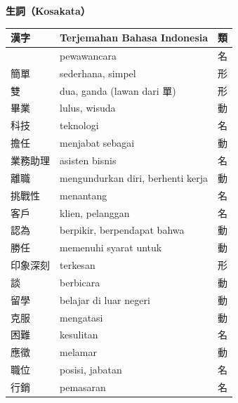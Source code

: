 \documentclass[a4paper,12pt]{ctexart}
\newcommand{\vocabnohi}[1]{{\fontsize{14pt}{16pt}\selectfont\hanwangfont #1}}
\begin{document}
\vspace{1cm}
\begin{center}
{\Large\bfseries 生詞（Kosakata）}
\end{center}

\begin{longtable}{|>{\centering\arraybackslash}p{3.5cm}|p{8.5cm}|>{\centering\arraybackslash}p{1.5cm}|}
\hline
\rowcolor[gray]{0.9}
\textbf{漢字} & \textbf{Terjemahan Bahasa Indonesia} & \textbf{類} \\
\hline
\vocabnohi{面試官} & pewawancara & {\footnotesize 名} \\
\hline
\vocabnohi{簡單} & sederhana, simpel & {\footnotesize 形} \\
\hline
\vocabnohi{雙} & dua, ganda (lawan dari 單) & {\footnotesize 形} \\
\hline
\vocabnohi{畢業} & lulus, wisuda & {\footnotesize 動} \\
\hline
\vocabnohi{科技} & teknologi & {\footnotesize 名} \\
\hline
\vocabnohi{擔任} & menjabat sebagai & {\footnotesize 動} \\
\hline
\vocabnohi{業務助理} & asisten bisnis & {\footnotesize 名} \\
\hline
\vocabnohi{離職} & mengundurkan diri, berhenti kerja & {\footnotesize 動} \\
\hline
\vocabnohi{挑戰性} & menantang & {\footnotesize 名} \\
\hline
\vocabnohi{客戶} & klien, pelanggan & {\footnotesize 名} \\
\hline
\vocabnohi{認為} & berpikir, berpendapat bahwa & {\footnotesize 動} \\
\hline
\vocabnohi{勝任} & memenuhi syarat untuk & {\footnotesize 動} \\
\hline
\vocabnohi{印象深刻} & terkesan & {\footnotesize 形} \\
\hline
\vocabnohi{談} & berbicara & {\footnotesize 動} \\
\hline
\vocabnohi{留學} & belajar di luar negeri & {\footnotesize 動} \\
\hline
\vocabnohi{克服} & mengatasi & {\footnotesize 動} \\
\hline
\vocabnohi{困難} & kesulitan & {\footnotesize 名} \\
\hline
\vocabnohi{應徵} & melamar & {\footnotesize 動} \\
\hline
\vocabnohi{職位} & posisi, jabatan & {\footnotesize 名} \\
\hline
\vocabnohi{行銷} & pemasaran & {\footnotesize 名} \\

\end{longtable}
\end{document}
